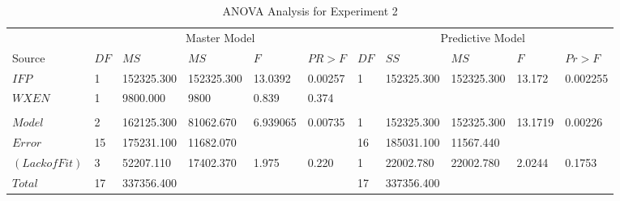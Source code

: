 \documentclass[times, 10pt,onecolumn]{article}
\begin{document}
\begin{table}
  \centering
  \begin{tabular}{llllll|lllll}
    \multicolumn{1}{c}{} & \multicolumn{5}{c|}{Master Model}&\multicolumn{5}{c}{Predictive Model} \\
    Source&$DF$&$MS$&$MS$&$F$&$PR>F$&$DF$&$SS$&$MS$&$F$&$Pr>F$ \\
    \hline
    $IFP$&1&152325.300&152325.300 &13.0392&0.00257&1&152325.300&152325.300&13.172&0.002255 \\
    $WXEN$&1&9800.000&9800&0.839&0.374&&&&& \\
    &&&&&&&&&& \\
    $Model$&2&162125.300&81062.670&6.939065&0.00735&1&152325.300&152325.300&13.1719&0.00226\\
    $Error$&15&175231.100&11682.070&&&16&185031.100&11567.440&&\\
    $(Lack of Fit)$&3&52207.110&17402.370&1.975&0.220&1&22002.780&22002.780&2.0244&0.1753\\
    $Total$&17&337356.400& & & &17&337356.400&&& \\
  \end{tabular}
  \caption{ANOVA Analysis for Experiment 2}
  \label{tab:exp2anova}
\end{table}
\end{document}
